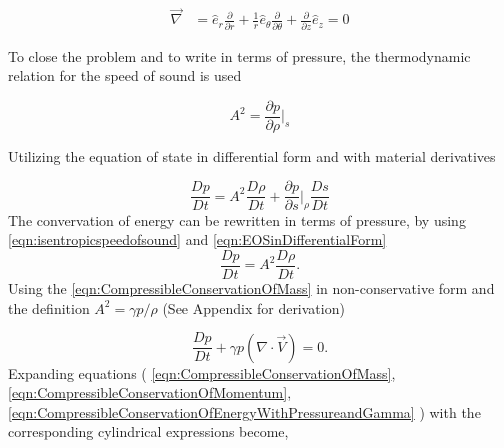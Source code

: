 \begin{align}
	\vec{\nabla} 
	&= \hat{e}_r \frac{\partial} {\partial r} + 
	\frac{1}{r} \hat{e}_{\theta}   
	\frac{\partial} {\partial \theta} + 
	\frac{\partial }{\partial z} \hat{e}_z = 0
    \label{eqn:NablaInCylindrical}
\end{align}

To close the problem and to write \label{eqn:CompressibleConservationOfEnergy}
in terms of pressure, the thermodynamic relation for the speed of sound is used

\begin{equation}
    A^2 = \frac{\partial p}{\partial \rho}\Big|_s
    \label{eqn:isentropicspeedofsound}
\end{equation}

Utilizing the equation of state in differential form and with material derivatives

\begin{equation}
    \frac{D p}{Dt } = A^2 \frac{D \rho }{D t } + \frac{\partial p}{\partial s}%
    \Big|_{\rho} \frac{Ds}{Dt} 
    \label{eqn:EOSinDifferentialForm}
\end{equation}
The convervation of energy can be rewritten in terms of pressure, by using 
\ref{eqn:isentropicspeedofsound} and \ref{eqn:EOSinDifferentialForm}
\begin{equation}
    \frac{D p}{D t} = A^2 \frac{D \rho}{Dt}.
    \label{eqn:CompressibleConservationOfEnergyWithPressure}
\end{equation}
Using the \ref{eqn:CompressibleConservationOfMass} in non-conservative form 
and the definition $A^2 = \gamma p / \rho$ 
(See Appendix for derivation)

\begin{equation}
    \frac{D p}{D t} + \gamma p \left( \nabla \cdot \vec{V} \right)= 0.
    \label{eqn:CompressibleConservationOfEnergyWithPressureandGamma}
\end{equation}
Expanding equations
(
\ref{eqn:CompressibleConservationOfMass},
\ref{eqn:CompressibleConservationOfMomentum},
\ref{eqn:CompressibleConservationOfEnergyWithPressureandGamma}
) with the corresponding cylindrical expressions become, 

